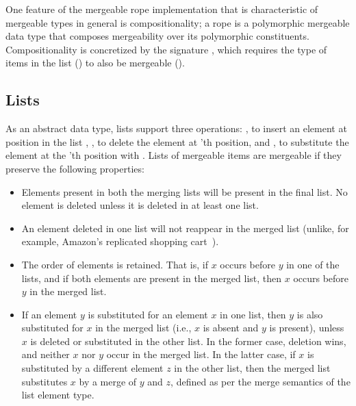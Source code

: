 One feature of the mergeable rope implementation that is characteristic
of mergeable types in general is compositionality; a rope is a
polymorphic mergeable data type that composes mergeability over its
polymorphic constituents.   Compositionality is concretized by the
 signature , which requires the type of items in the list
() to also be mergeable ().

\subsection{Lists}
\label{sec:lists}



As an abstract data type, lists support three operations: , to insert an element  at position  in the list
, , to delete the element at 'th position, and
, to substitute the element at the 'th position
with .  Lists of mergeable items are mergeable if they preserve
the following properties:
\begin{itemize}
  \item Elements present in both the merging lists will be present in
  the final list. No element is deleted unless it is deleted in at
  least one list.
  \item An element deleted in one list will not reappear in the merged
  list (unlike, for example, Amazon's replicated shopping cart~\cite{Dynamo}).
  \item The order of elements is retained. That is, if $x$ occurs
  before $y$ in one of the lists, and if both elements are present in
  the merged list, then $x$ occurs before $y$ in the merged list.
\item If an element $y$ is substituted for an element $x$ in one list,
  then $y$ is also substituted for $x$ in the merged list (i.e., $x$
  is absent and $y$ is present), unless $x$ is deleted or substituted
  in the other list. In the former case, deletion wins, and neither
  $x$ nor $y$ occur in the merged list. In the latter case, if $x$ is
  substituted by a different element $z$ in the other list, then the
  merged list substitutes $x$ by a merge of $y$ and $z$, defined as
  per the merge semantics of the list element type.
\end{itemize}

